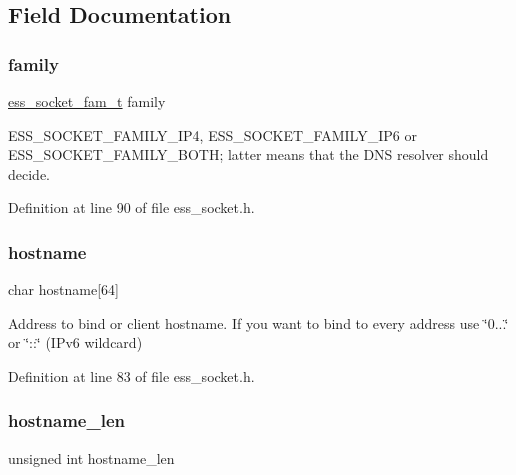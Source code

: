 \subsection{Field Documentation}
\mbox{\label{structess__socket_ad09623d57ebd33fef8dac4e18c0cba2f}} 
\subsubsection{\texorpdfstring{family}{family}}
{\footnotesize\ttfamily \hyperlink{ess__socket_8h_a9305eae437d57846661e997bb755d150}{ess\+\_\+socket\+\_\+fam\+\_\+t} family}

{\ttfamily E\+S\+S\+\_\+\+S\+O\+C\+K\+E\+T\+\_\+\+F\+A\+M\+I\+L\+Y\+\_\+\+I\+P4}, {\ttfamily E\+S\+S\+\_\+\+S\+O\+C\+K\+E\+T\+\_\+\+F\+A\+M\+I\+L\+Y\+\_\+\+I\+P6} or {\ttfamily E\+S\+S\+\_\+\+S\+O\+C\+K\+E\+T\+\_\+\+F\+A\+M\+I\+L\+Y\+\_\+\+B\+O\+TH}; latter means that the D\+NS resolver should decide. 

Definition at line 90 of file ess\+\_\+socket.\+h.

\mbox{\label{structess__socket_a0c6be700c8763c26054098348ebef8d6}} 
\subsubsection{\texorpdfstring{hostname}{hostname}}
{\footnotesize\ttfamily char hostname\mbox{[}64\mbox{]}}

Address to bind or client hostname. If you want to bind to every address use \char`\"{}0...\char`\"{} or \char`\"{}\+::\char`\"{} (I\+Pv6 wildcard) 

Definition at line 83 of file ess\+\_\+socket.\+h.

\mbox{\label{structess__socket_a4d0d74743d167680649419163ce8c80e}} 
\subsubsection{\texorpdfstring{hostname\+\_\+len}{hostname\_len}}
{\footnotesize\ttfamily unsigned int hostname\+\_\+len}



